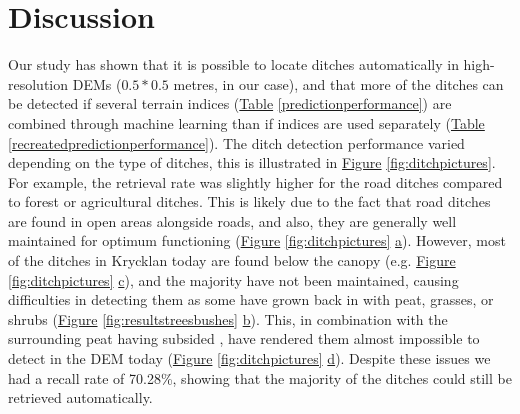 \documentclass[11pt, review]{elsarticle} %
\begin{document}
\section{Discussion}

Our study has shown that it is possible to locate ditches automatically in high-resolution DEMs ($0.5  * 0.5 $ metres, in our case), and that more of the ditches can be detected if several terrain indices (\hyperref[predictionperformance]{Table} \ref{predictionperformance}) are combined through machine learning than if indices are used separately (\hyperref[recreatedpredictionperformance]{Table} \ref{recreatedpredictionperformance}). The ditch detection performance varied depending on the type of ditches, this is illustrated in \hyperref[fig:ditchpictures]{Figure} \ref{fig:ditchpictures}. For example, the retrieval rate was slightly higher for the road ditches compared to forest or agricultural ditches. This is likely due to the fact that  road ditches are found in open areas alongside roads, and also,   they are generally well maintained for optimum functioning (\hyperref[fig:ditchpictures]{Figure} \ref{fig:ditchpictures} \hyperref[fig:ditchpictures]{a}). However, most of the ditches in Krycklan today are found below the canopy (e.g. \hyperref[fig:ditchpictures]{Figure} \ref{fig:ditchpictures} \hyperref[fig:ditchpictures]{c}), and the majority have not been maintained, causing difficulties in detecting them as some have grown back in with peat, grasses, or shrubs (\hyperref[fig:resultstreesbushes]{Figure} \ref{fig:resultstreesbushes} \hyperref[fig:resultstreesbushes]{b}). This, in combination with the surrounding peat having subsided \citep{heikurainen}, have rendered them almost impossible to detect in the DEM today (\hyperref[fig:ditchpictures]{Figure} \ref{fig:ditchpictures} \hyperref[fig:ditchpictures]{d}). Despite these issues we had a recall rate of 70.28\%, showing that the majority of the ditches could still be retrieved automatically.
\end{document}
